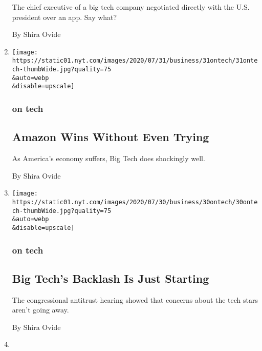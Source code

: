 \begin{enumerate}
  The chief executive of a big tech company negotiated directly with the
  U.S. president over an app. Say what?

  By Shira Ovide
\item
  \href{/2020/07/31/technology/amazon-earnings.html}{}

  \texttt{[image: https://static01.nyt.com/images/2020/07/31/business/31ontech/31ontech-thumbWide.jpg?quality=75\\\&auto=webp\\\&disable=upscale]}

  \hypertarget{on-tech-5}{%
  \subsubsection{on tech}\label{on-tech-5}}

  \hypertarget{amazon-wins-without-even-trying}{%
  \subsection{Amazon Wins Without Even
  Trying}\label{amazon-wins-without-even-trying}}

  As America's economy suffers, Big Tech does shockingly well.

  By Shira Ovide
\item
  \href{/2020/07/30/technology/big-tech-backlash.html}{}

  \texttt{[image: https://static01.nyt.com/images/2020/07/30/business/30ontech/30ontech-thumbWide.jpg?quality=75\\\&auto=webp\\\&disable=upscale]}

  \hypertarget{on-tech-6}{%
  \subsubsection{on tech}\label{on-tech-6}}

  \hypertarget{big-techs-backlash-is-just-starting}{%
  \subsection{Big Tech's Backlash Is Just
  Starting}\label{big-techs-backlash-is-just-starting}}

  The congressional antitrust hearing showed that concerns about the
  tech stars aren't going away.

  By Shira Ovide
\item
  \href{/live/2020/07/29/technology/tech-ceos-hearing-testimony/dont-only-blame-congress-if-this-hearing-goes-off-the-rails}{}

  \hypertarget{dont-only-blame-congress-if-this-hearing-goes-off-the-rails}{%
}
\end{enumerate}
